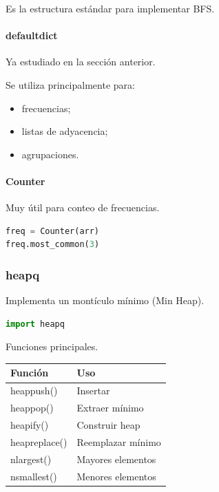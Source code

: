 Es la estructura estándar para implementar BFS.

\vspace{0.3cm}

\paragraph{defaultdict}

Ya estudiado en la sección anterior.

Se utiliza principalmente para:

\begin{itemize}
\item frecuencias;
\item listas de adyacencia;
\item agrupaciones.
\end{itemize}

\vspace{0.3cm}

\paragraph{Counter}

Muy útil para conteo de frecuencias.

\begin{lstlisting}[language=Python]
freq = Counter(arr)
freq.most_common(3)
\end{lstlisting}

\vspace{0.3cm}

\subsubsection{heapq}

Implementa un montículo mínimo (Min Heap).

\begin{lstlisting}[language=Python]
import heapq
\end{lstlisting}

Funciones principales.

\begin{center}
\begin{tabular}{|l|l|}
\hline
Función & Uso \\ \hline
heappush() & Insertar \\ \hline
heappop() & Extraer mínimo \\ \hline
heapify() & Construir heap \\ \hline
heapreplace() & Reemplazar mínimo \\ \hline
nlargest() & Mayores elementos \\ \hline
nsmallest() & Menores elementos \\ \hline
\end{tabular}
\end{center}

